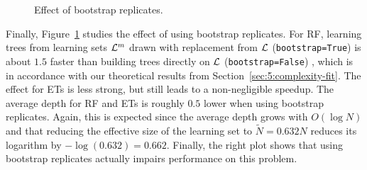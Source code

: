 \begin{figure}
\hspace{-1.75cm}
\caption{Effect of bootstrap replicates.}
\label{fig:5:artificial:bootstrap}
\end{figure}

Finally, Figure~\ref{fig:5:artificial:bootstrap} studies the effect of using
bootstrap replicates. For RF, learning trees from learning sets ${\cal L}^m$
drawn with replacement from ${\cal L}$ (\texttt{bootstrap=True}) is about $1.5$ faster than building
trees directly on ${\cal L}$ (\texttt{bootstrap=False}) , which is in accordance with our theoretical
results from Section~\ref{sec:5:complexity-fit}. The effect for ETs is less
strong, but still leads to a non-negligible speedup. The average depth for RF
and ETs is roughly $0.5$ lower when using bootstrap replicates. Again, this is
expected since the average depth grows with $O(\log N)$ and that reducing the
effective size of the learning set to $\widetilde{N} = 0.632N$ reduces its
logarithm by $-\log(0.632) = 0.662$. Finally, the right plot shows that using
bootstrap replicates actually impairs performance on this problem.

